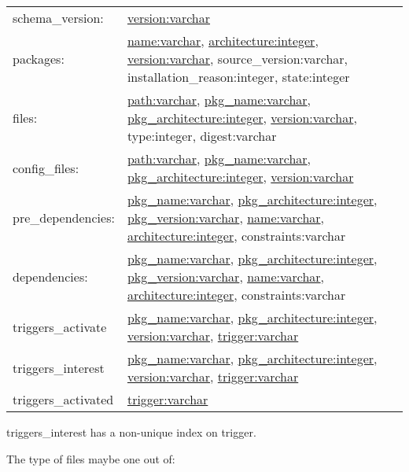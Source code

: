 \documentclass[a4paper]{scrartcl}
\begin{document}
	\begin{table}[H]
		\centering
		
		{
		\setlength{\extrarowheight}{0.5eM}
		\sffamily
		\hyphenchar{}
		\begin{tabularx}{\textwidth}{lX}
			schema\_version: & \underline{version:varchar} \\
			packages: & \underline{name:varchar}, \underline{architecture:integer}, \underline{version:varchar}, source\_version:varchar, installation\_reason:integer, state:integer \\
			
			files: & \underline{path:varchar}, \underline{pkg\_name:varchar}, \underline{pkg\_architecture:integer}, \underline{version:varchar}, type:integer, digest:varchar \\
			
			config\_files: & \underline{path:varchar}, \underline{pkg\_name:varchar}, \underline{pkg\_architecture:integer}, \underline{version:varchar} \\
			
			pre\_dependencies: & \underline{pkg\_name:varchar}, \underline{pkg\_architecture:integer}, \underline{pkg\_version:varchar}, \underline{name:varchar}, \underline{architecture:integer}, constraints:varchar \\
			dependencies: & \underline{pkg\_name:varchar}, \underline{pkg\_architecture:integer}, \underline{pkg\_version:varchar}, \underline{name:varchar}, \underline{architecture:integer}, constraints:varchar \\
			
			triggers\_activate & \underline{pkg\_name:varchar}, \underline{pkg\_architecture:integer}, \underline{version:varchar}, \underline{trigger:varchar} \\
			triggers\_interest & \underline{pkg\_name:varchar}, \underline{pkg\_architecture:integer}, \underline{version:varchar}, \underline{trigger:varchar} \\
			
			triggers\_activated & \underline{trigger:varchar} \\
		\end{tabularx}
		}
	
		\vspace{0.5eM}
		\begin{flushleft}
			\textsf{triggers\_interest} has a non-unique index on \textsf{trigger}.
		\end{flushleft}
	
		\vspace{1eM}
		The type of files maybe one out of:
		

\end{table}
\end{document}
